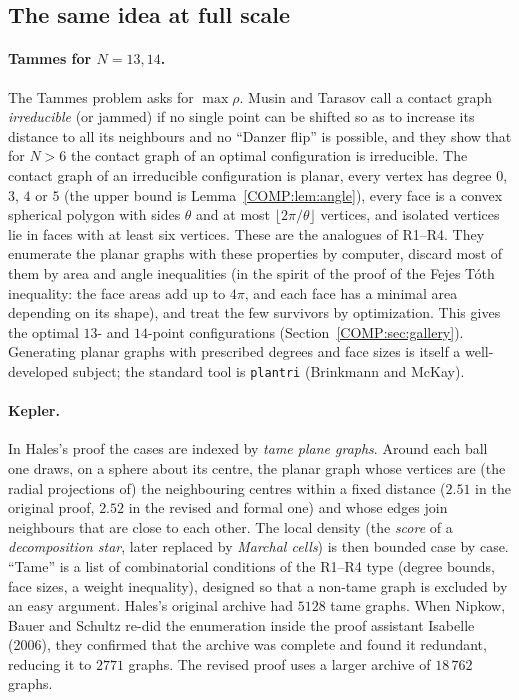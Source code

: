 \subsection{The same idea at full scale}
\paragraph{Tammes for $N=13,14$.} The Tammes problem asks for $\max\rho$. Musin and Tarasov call a
contact graph \emph{irreducible} (or jammed) if no single point can be shifted so as to increase its
distance to all its neighbours and no ``Danzer flip'' is possible, and they show that for $N>6$ the
contact graph of an optimal configuration is irreducible. The
contact graph of an irreducible configuration is planar, every vertex has degree $0$, $3$, $4$ or $5$
(the upper bound is Lemma~\ref{COMP:lem:angle}), every face is a convex spherical polygon with sides $\theta$ and at most
$\lfloor2\pi/\theta\rfloor$ vertices, and isolated vertices lie in faces with at least six vertices.
These are the analogues of R1--R4. They enumerate the planar graphs with these properties by computer,
discard most of them by area and angle inequalities (in the spirit of the proof of the Fejes T\'oth
inequality: the face areas add up to $4\pi$, and each face has a minimal area depending on its
shape), and treat the few survivors by optimization. This gives the optimal $13$- and $14$-point
configurations (Section~\ref{COMP:sec:gallery}). Generating planar graphs with prescribed degrees and face
sizes is itself a well-developed subject; the standard tool is \texttt{plantri} (Brinkmann and McKay).

\paragraph{Kepler.} In Hales's proof the cases are indexed by \emph{tame plane graphs}. Around each ball
one draws, on a sphere about its centre, the planar graph whose vertices are (the radial projections of)
the neighbouring centres within a fixed distance ($2.51$ in the original proof, $2.52$ in the revised and formal
one) and whose edges join neighbours that are close to each other. The local density (the \emph{score} of a
\emph{decomposition star}, later replaced by \emph{Marchal cells}) is then bounded case by case.
``Tame'' is a list of combinatorial conditions of the R1--R4 type (degree bounds, face sizes, a weight
inequality), designed so that a non-tame graph is excluded by an easy argument. Hales's original archive
had $5128$ tame graphs. When Nipkow, Bauer and Schultz re-did the enumeration inside the proof assistant
Isabelle (2006), they confirmed that the archive was complete and found it redundant, reducing it to
$2771$ graphs. The revised proof uses a larger archive of $18\,762$ graphs.

